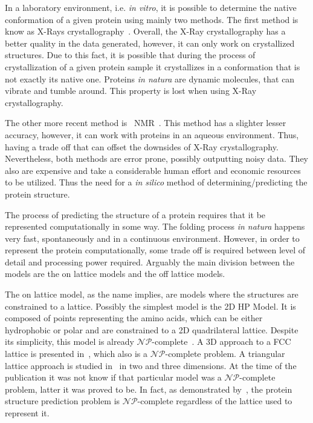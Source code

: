 In a laboratory environment, i.e. \textit{in vitro}, it is possible to determine the native conformation of a given protein using mainly two methods. The first method is know as X-Rays crystallography~\cite{nelson2008lehninger}. Overall, the X-Ray crystallography has a better quality in the data generated, however, it can only work on crystallized structures. Due to this fact, it is possible that during the process of crystallization of a given protein sample it crystallizes in a conformation that is not exactly its native one. Proteins \textit{in natura} are dynamic molecules, that can vibrate and tumble around. This property is lost when using X-Ray crystallography.

The other more recent method is ~\ac{NMR}~\cite{nelson2008lehninger}. This method has a slighter lesser accuracy, however, it can work with proteins in an aqueous environment. Thus, having a trade off that can offset the downsides of X-Ray crystallography. Nevertheless, both methods are error prone, possibly outputting noisy data. They also are expensive and take a considerable human effort and economic resources to be utilized.
Thus the need for a \textit{in silico} method of determining/predicting the protein structure.

The process of predicting the structure of a protein requires that it be represented computationally in some way. The folding process \textit{in natura} happens very fast, spontaneously and in a continuous environment. However, in order to represent the protein computationally, some trade off is required between level of detail and processing power required. Arguably the main division between the models are the on lattice models and the off lattice models.

The on lattice model, as the name implies, are models where the structures are constrained to a lattice. Possibly the simplest model is the 2D \ac{HP} Model. It is composed of points representing the amino acids, which can be either hydrophobic or polar and are constrained to a 2D quadrilateral lattice. Despite its simplicity, this model is already $\mathcal{NP}$-complete~\cite{berger1998protein}. A 3D approach to a \ac{FCC} lattice is presented in~\cite{hoque2007protein}, which also is a $\mathcal{NP}$-complete problem. A triangular lattice approach is studied in~\cite{agarwala1997local} in two and three dimensions. At the time of the publication it was not know if that particular model was a $\mathcal{NP}$-complete problem, latter it was proved to be. In fact, as demonstrated by~\cite{hart1997robust}, the protein structure prediction problem is $\mathcal{NP}$-complete regardless of the lattice used to represent it.

